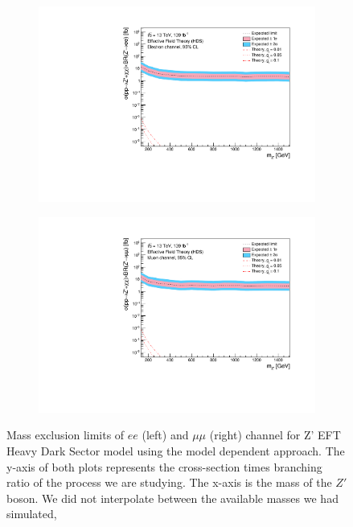 \documentclass[12pt, a4paper]{book}
\begin{document}
\begin{figure}[!ht]
	\centering
   \begin{subfigure}[b]{0.49\textwidth}
      \centering
      \includegraphics[width=1\textwidth]{Limits/EFT_HDS/mass_exclusion_ee.pdf}
      \end{subfigure}
   \hfill
   \begin{subfigure}[b]{0.49\textwidth}
      \centering
      \includegraphics[width=1\textwidth]{Limits/EFT_HDS/mass_exclusion_uu.pdf}
      \end{subfigure}
   \caption[Expected mass exclusion limits of $ee$ and $\mu\mu$ channel for all Z' EFT HDS model using the model dependent approach]{Mass exclusion limits of $ee$ (left) and $\mu\mu$ (right) channel for Z' EFT Heavy Dark Sector model using the model dependent approach. The y-axis of both plots represents the cross-section times branching ratio of the process we are studying. The x-axis is the mass of the $Z'$ boson. We did not interpolate between the available masses we had simulated, 
}
\end{figure}
\end{document}
